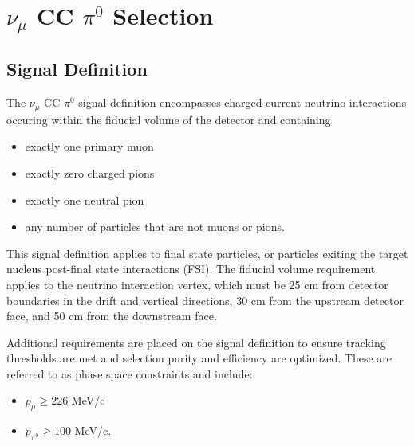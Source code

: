 \documentclass[../main.tex]{subfiles}
\begin{document}
\section{$\nu_{\mu}$ CC $\pi^{0}$ Selection}
\label{sec:selection}


\subsection{Signal Definition}
The $\nu_{\mu}$ CC $\pi^{0}$ signal definition encompasses charged-current neutrino interactions occuring within the fiducial volume of the detector and containing
\begin{itemize}
    \item exactly one primary muon
    \item exactly zero charged pions
    \item exactly one neutral pion
    \item any number of particles that are not muons or pions.
\end{itemize}
This signal definition applies to final state particles, or particles exiting the target nucleus post-final state interactions (FSI).  The fiducial volume requirement applies to the neutrino interaction vertex, which must be 25 cm from detector boundaries in the drift and vertical directions, 30 cm from the upstream detector face, and 50 cm from the downstream face.

Additional requirements are placed on the signal definition to ensure tracking thresholds are met and selection purity and efficiency are optimized.  These are referred to as phase space constraints and include:
\begin{itemize}
    \item $p_{\mu} \ge 226$ MeV/c
    \item $p_{\pi^{0}} \ge 100$ MeV/c.
\end{itemize}
\end{document}
